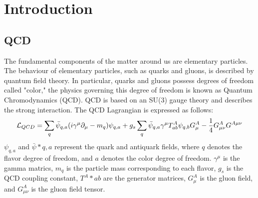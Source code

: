 \section{Introduction}
    \subsection{QCD}
    \label{Intro:QCD}
        The fundamental components of the matter around us are elementary particles. The behaviour of elementary particles, such as quarks and gluons, is described by quantum field theory. In particular, quarks and gluons possess degrees of freedom called "color," the physics governing this degree of freedom is known as Quantum Chromodynamics (QCD). QCD is based on an SU(3) gauge theory and describes the strong interaction. The QCD Lagrangian is expressed as follows:
        \begin{eqnarray}
            \label{QCDlagrangian}
            \mathcal{L}_{QCD}=\sum_q \bar{\psi}_{q,a}\qty(i\gamma^\mu\partial_\mu-m_q)\psi_{q,a}+g_s \sum_q \bar{\psi}_{q,a}\gamma^\mu T^A_{ab}\psi_{q,b}G^A_\mu-\frac{1}{4}G^A_{\mu\nu}G^{A\mu\nu}
        \end{eqnarray}
        $\psi_{q,a}$ and $\bar{\psi}*{q,a}$ represent the quark and antiquark fields, where $q$ denotes the flavor degree of freedom, and $a$ denotes the color degree of freedom. $\gamma^\mu$ is the gamma matrics, $m_q$ is the particle mass corresponding to each flavor, $g_s$ is the QCD coupling constant, $T^A*{ab}$ are the generator matrices, $G^A_\mu$ is the gluon field, and $G^A_{\mu\nu}$ is the gluon field tensor.

